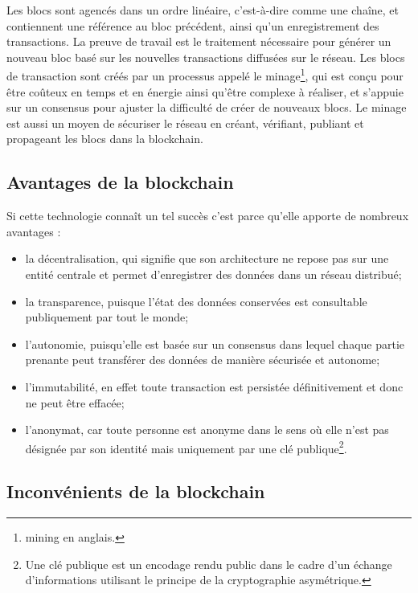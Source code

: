 \documentclass{tnreport}
\begin{document}
Les blocs sont agencés dans un ordre linéaire, c'est-à-dire comme une chaîne, et contiennent une référence au bloc précédent, ainsi qu'un enregistrement des transactions.
La preuve de travail est le traitement nécessaire pour générer un nouveau bloc basé sur les nouvelles transactions diffusées sur le réseau.
Les blocs de transaction sont créés par un processus appelé le minage\footnote{mining en anglais.}, qui est conçu pour être coûteux en temps et en énergie ainsi qu'être complexe à réaliser, et s'appuie sur un consensus pour ajuster la difficulté de créer de nouveaux blocs. Le minage est aussi un moyen de sécuriser le réseau en créant, vérifiant, publiant et propageant les blocs dans la blockchain.

\subsection{Avantages de la blockchain}

Si cette technologie connaît un tel succès c'est parce qu'elle apporte de nombreux avantages : 
\begin{itemize}
	\item la décentralisation, qui signifie que son architecture ne repose pas sur une entité centrale et permet d'enregistrer des données dans un réseau distribué; 
	\item la transparence, puisque l'état des données conservées est consultable publiquement par tout le monde; 
	\item l'autonomie, puisqu'elle est basée sur un consensus dans lequel chaque partie prenante peut transférer des données de manière sécurisée et autonome;
	\item l'immutabilité, en effet toute transaction est persistée définitivement et donc ne peut être effacée;
	\item l'anonymat, car toute personne est anonyme dans le sens où elle n'est pas désignée par son identité mais uniquement par une clé publique\footnote{Une clé publique est un encodage rendu public dans le cadre d'un échange d'informations utilisant le principe de la cryptographie asymétrique.}.
\end{itemize}

\subsection{Inconvénients de la blockchain}
\label{sec:drawbacks-blockchain}
\end{document}
